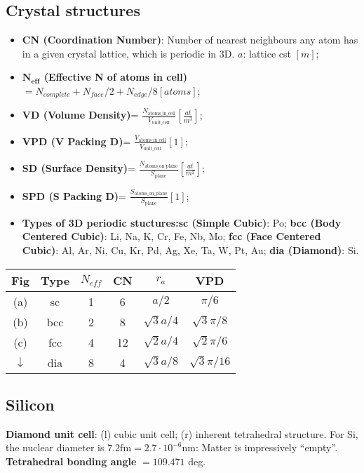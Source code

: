 \documentclass[a4paper, fontsize=8pt, landscape, DIV=1]{scrartcl}
\begin{document}
\begin{multicols*}{4}
  \subsection{Crystal structures}
  \begin{itemize}[noitemsep,nolistsep]
  \item\textbf{CN (Coordination Number)}: Number of nearest neighbours any atom has in a given crystal lattice, which is periodic in 3D. $a$: lattice cst $[m]$;
  \item\textbf{$\bm{N_{eff}}$ (Effective N of atoms in cell)}$=N_{complete}+N_{face}/2+N_{edge}/8[atoms]$;
  \item\textbf{VD (Volume Density)}= $\frac{N_\text{atoms\_in\_cell}}{V_\text{unit\_cell}}\left[\frac{at}{m^3}\right]$;
  \item\textbf{VPD (V Packing D)}= $\frac{V_\text{atoms\_in\_cell}}{V_\text{unit\_cell}}[1]$;
  \item\textbf{SD (Surface Density)}= $\frac{N_\text{atoms\_on\_plane}}{S_\text{plane}}\left[\frac{at}{m^2}\right]$;
  \item\textbf{SPD (S Packing D)}= $\frac{S_\text{atoms\_on\_plane}}{S_\text{plane}}[1]$;
  \item\textbf{Types of 3D periodic stuctures:}\textbf{sc (Simple Cubic)}: Po; \textbf{bcc (Body Centered Cubic)}: Li, Na, K, Cr, Fe, Nb, Mo; \textbf{fcc (Face Centered Cubic)}: Al, Ar, Ni, Cu, Kr, Pd, Ag, Xe, Ta, W, Pt, Au; \textbf{dia (Diamond)}: Si.
	\end{itemize}
  \begin{center}
    \begin{tabular}[h]{c c c c c c}
    Fig & Type & $N_{eff}$ & CN & $r_a$ & VPD\\\hline	
	(a) & sc & 1 & 6 & $a/2$ & $\pi/6$\\
	(b) & bcc & 2 & 8 & $\sqrt{3}a/4$ & $\sqrt{3}\pi/8$\\
	(c) & fcc & 4 & 12 & $\sqrt{2}a/4$ & $\sqrt{2}\pi/6$\\
	$\downarrow$ & dia & 8 & 4 & $\sqrt{3}a/8$ & $\sqrt{3}\pi/16$\\
  \end{tabular}
	\end{center}


  \subsection{Silicon}
  \textbf{Diamond unit cell}: (l) cubic unit cell; (r) inherent tetrahedral structure. For Si, the nuclear diameter is $7.2\text{fm} = 2.7\cdot 10^{-6}\text{nm}$: Matter is impressively ``empty''. \textbf{Tetrahedral bonding angle} $=109.471$ deg.


\end{multicols*}
\end{document}
